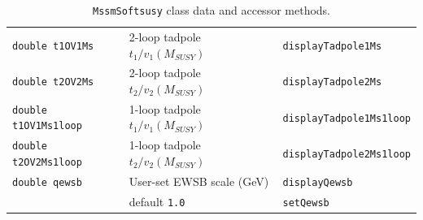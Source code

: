 \documentclass{article}
\def\code#1{\small{\tt #1}\normalsize}
\begin{document}
\begin{table}
\begin{center}
\begin{tabular}{lll}
\code{double t1OV1Ms} & 2-loop tadpole $t_1/v_1(M_{SUSY})$ & \code{displayTadpole1Ms} \\
\code{double t2OV2Ms} & 2-loop tadpole $t_2/v_2(M_{SUSY})$ & \code{displayTadpole2Ms} \\
\code{double t1OV1Ms1loop} & 1-loop tadpole $t_1/v_1(M_{SUSY})$ & \code{displayTadpole1Ms1loop} \\
\code{double t2OV2Ms1loop} & 1-loop tadpole $t_2/v_2(M_{SUSY})$ & \code{displayTadpole2Ms1loop} \\
\hline
\code{double qewsb} & User-set EWSB scale (GeV) & \code{displayQewsb} \\
                    & default \code{1.0}   & \code{setQewsb} \\
\hline
\end{tabular}\caption{\label{tab:mssmsoftdata}\code{MssmSoftsusy} class data and accessor methods.}\end{center}\end{table}
\end{document}
